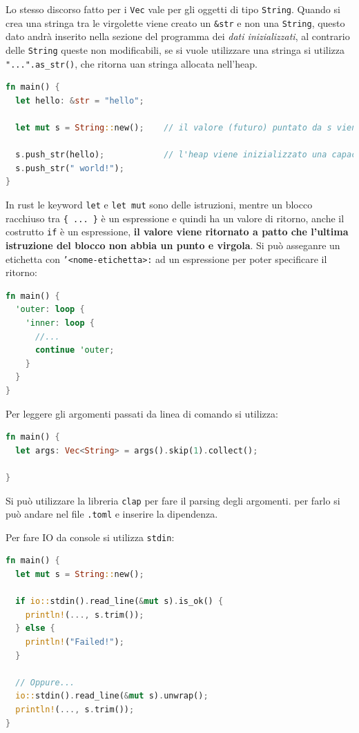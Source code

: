 \documentclass[12pt]{article}
\begin{document}
Lo stesso discorso fatto per i \texttt{Vec} vale per gli oggetti di tipo \texttt{String}. Quando si crea una stringa tra le virgolette viene creato un \texttt{\&str} e non una \texttt{String}, questo dato andr\`a inserito nella sezione del programma dei \emph{dati inizializzati}, al contrario delle \texttt{String} queste non modificabili, se si vuole utilizzare una stringa si utilizza \texttt{"...".as\_str()}, che ritorna uan stringa allocata nell'heap.
\begin{lstlisting}[language=rust]
fn main() {
  let hello: &str = "hello";

  let mut s = String::new();    // il valore (futuro) puntato da s viene allocato nell'heap

  s.push_str(hello);            // l'heap viene inizializzato una capacita' ed un size uguale al size della stringa puntata da "hello"
  s.push_str(" world!");
}
\end{lstlisting}
In rust le keyword \texttt{let} e \texttt{let mut} sono delle istruzioni, mentre un blocco racchiuso tra \verb|{ ... }| \`e un espressione e quindi ha un valore di ritorno, anche il costrutto \texttt{if} \`e un espressione, \textbf{il valore viene ritornato a patto che l'ultima istruzione del blocco non abbia un punto e virgola}. Si pu\`o asseganre un etichetta con \texttt{'<nome-etichetta>:} ad un espressione per poter specificare il ritorno:
\begin{lstlisting}[language=rust]
fn main() {
  'outer: loop {
    'inner: loop {
      //...
      continue 'outer;
    }
  }
}
\end{lstlisting}

Per leggere gli argomenti passati da linea di comando si utilizza:
\begin{lstlisting}[language=rust]
fn main() {
  let args: Vec<String> = args().skip(1).collect();

}
\end{lstlisting}
Si pu\`o utilizzare la libreria \texttt{clap} per fare il parsing degli argomenti. per farlo si pu\`o andare nel file \texttt{.toml} e inserire la dipendenza.


Per fare IO da console si utilizza \texttt{stdin}:
\begin{lstlisting}[language=rust]
fn main() {
  let mut s = String::new();

  if io::stdin().read_line(&mut s).is_ok() {
    println!(..., s.trim());
  } else {
    println!("Failed!");
  }

  // Oppure...
  io::stdin().read_line(&mut s).unwrap();
  println!(..., s.trim());
}
\end{lstlisting}
\end{document}
